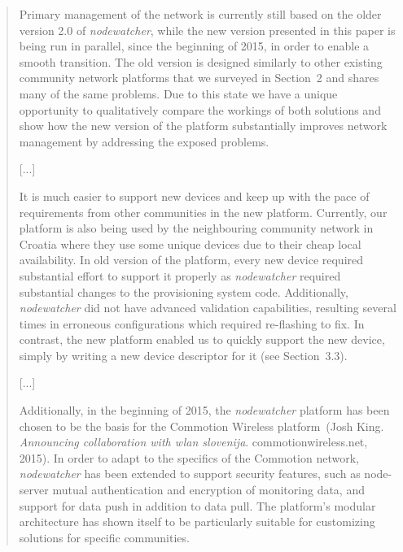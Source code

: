 \documentclass[12pt,twoside,a4paper]{report}
\newcommand{\nodewatcher}{\textit{nodewatcher}}
\begin{document}
\begin{quote}
Primary management of the network is currently still based on the older version 2.0 of \nodewatcher{}, while the new version presented in this paper is being run in parallel, since the beginning of 2015, in order to enable a smooth transition.
The old version is designed similarly to other existing community network platforms that we surveyed in Section~2 and shares many of the same problems.
Due to this state we have a unique opportunity to qualitatively compare the workings of both solutions and show how the new version of the platform substantially improves network management by addressing the exposed problems.

[...]

It is much easier to support new devices and keep up with the pace of requirements from other communities in the new platform.
Currently, our platform is also being used by the neighbouring community network in Croatia where they use some unique devices due to their cheap local availability.
In old version of the platform, every new device required substantial effort to support it properly as \nodewatcher{} required substantial changes to the provisioning system code.
Additionally, \nodewatcher{} did not have advanced validation capabilities, resulting several times in erroneous configurations which required re-flashing to fix.
In contrast, the new platform enabled us to quickly support the new device, simply by writing a new device descriptor for it (see Section~3.3).

[...]

Additionally, in the beginning of 2015, the \nodewatcher{} platform has been chosen to be the basis for the Commotion Wireless platform~(Josh King. \textit{Announcing collaboration with wlan slovenija}. commotionwireless.net, 2015).
In order to adapt to the specifics of the Commotion network, \nodewatcher{} has been extended to support security features, such as node-server mutual authentication and encryption of monitoring data, and support for data push in addition to data pull.
The platform's modular architecture has shown itself to be particularly suitable for customizing solutions for specific communities.
\end{quote}
\end{document}
